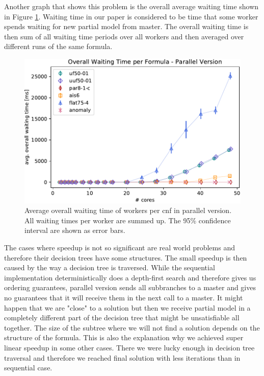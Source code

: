 \documentclass[letterpaper]{article}
\begin{document}
Another graph that shows this problem is the overall average waiting time shown in Figure \ref{fig:dpll_parallel_waiting}.
Waiting time in our paper is considered to be time that some worker spends waiting for new partial model from master.
The overall waiting time is then sum of all waiting time periods over all workers and then averaged over different runs of the same formula.
\begin{figure}
	\centering
	\includegraphics[width=\columnwidth]{figures/waiting_parallel_subset_dpll_scaling_tar.pdf}
	\caption{Average overall waiting time of workers per cnf in parallel version.
		All waiting times per worker are summed up.
		The 95\% confidence interval are shown as error bars.}
	\label{fig:dpll_parallel_waiting}
\end{figure}

The cases where speedup is not so significant are real world problems and therefore their decision trees have some structures. The small speedup is then caused by the way a decision tree is traversed.
While the sequential implementation deterministically does a depth-first search and therefore gives us ordering guarantees, parallel version sends all subbranches to a master and gives no guarantees that it will receive them in the next call to a master. 
It might happen that we are "close" to a solution but then we receive partial model in a completely different part of the decision tree that might be unsatisfiable all together. 
The size of the subtree where we will not find a solution depends on the structure of the formula.
This is also the explanation why we achieved super linear speedup in some other cases. 
There we were lucky enough in decision tree traversal and therefore we reached final solution with less iterations than in sequential case.
\end{document}
